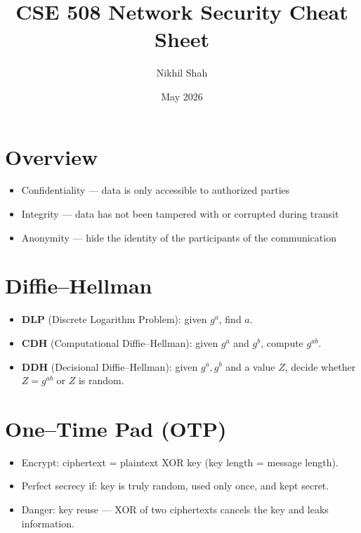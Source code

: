\documentclass[11pt]{article}
\title{CSE 508 Network Security Cheat Sheet}
\author{Nikhil Shah}
\date{May 2026}
\begin{document}
\maketitle
\tableofcontents
\clearpage

\section{Overview}
\begin{itemize}
  \item Confidentiality --- data is only accessible to authorized parties
  \item Integrity --- data has not been tampered with or corrupted during transit
  \item Anonymity --- hide the identity of the participants of the communication
\end{itemize}

\section{Diffie--Hellman}
\begin{itemize}
  \item \textbf{DLP} (Discrete Logarithm Problem): given $g^a$, find $a$.
  \item \textbf{CDH} (Computational Diffie--Hellman): given $g^a$ and $g^b$, compute $g^{ab}$.
  \item \textbf{DDH} (Decisional Diffie--Hellman): given $g^a, g^b$ and a value $Z$, decide whether $Z=g^{ab}$ or $Z$ is random.
\end{itemize}

\section{One--Time Pad (OTP)}
\begin{itemize}
  \item Encrypt: ciphertext = plaintext XOR key (key length = message length).
  \item Perfect secrecy if: key is truly random, used only once, and kept secret.
  \item Danger: key reuse --- XOR of two ciphertexts cancels the key and leaks information.
\end{itemize}
\end{document}
